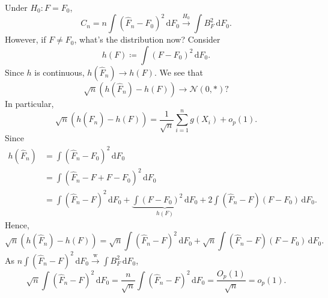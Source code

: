 Under \(H_0 \colon F = F_0\),
\[
	C_n = n \int (\hat{F} _n - F_0)^2 \,\mathrm{d} F_0
	\overset{H_0}{\to } \int B_F^2 \,\mathrm{d} F_0.
\]
However, if \(F \neq F_0\), what's the distribution now? Consider
\[
	h(F) \coloneqq \int (F - F_0)^2 \,\mathrm{d} F_0.
\]
Since \(h\) is continuous, \(h(\hat{F} _n) \to h(F) \). We see that
\[
	\sqrt{n} \left( h(\hat{F} _n) - h(F) \right)
	\to \mathcal{N} (0, \ast)?
\]
In particular,
\[
	\sqrt{n} \left( h(\hat{F} _n) - h(F) \right)
	= \frac{1}{\sqrt{n} } \sum_{i=1}^{n} g(X_i) + o_p(1).
\]
Since
\[
	\begin{split}
		h(\hat{F} _n)
		 & = \int (\hat{F} _n - F_0)^2 \,\mathrm{d} F_0                                                                                                             \\
		 & = \int (\hat{F} _n - F + F - F_0)^2 \,\mathrm{d} F_0                                                                                                     \\
		 & = \int (\hat{F} _n - F)^2 \,\mathrm{d} F_0 + \underbrace{\int (F - F_0)^2 \,\mathrm{d} F_0}_{h(F)} + 2 \int (\hat{F} _n - F) (F - F_0) \,\mathrm{d} F_0.
	\end{split}
\]
Hence,
\[
	\sqrt{n} \left( h(\hat{F} _n) - h(F) \right)
	= \sqrt{n} \int (\hat{F} _n - F)^2 \,\mathrm{d} F_0 + \sqrt{n} \int (\hat{F} _n - F) (F - F_0) \,\mathrm{d} F_0.
\]
As \(n \int (\hat{F} _n - F)^2 \,\mathrm{d} F_0 \overset{\text{w} }{\to} \int B_F^2 \,\mathrm{d} F_0\),
\[
	\sqrt{n} \int (\hat{F} _n - F)^2 \,\mathrm{d} F_0
	= \frac{n}{\sqrt{n} } \int (\hat{F} _n - F)^2 \,\mathrm{d} F_0
	= \frac{O_p(1)}{\sqrt{n} }
	= o_p(1).
\]